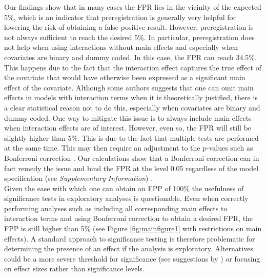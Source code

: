 
Our findings show that in many cases the FPR lies in the vicinity of the expected 5\%, which is an indicator that preregistration is generally very helpful for lowering the risk of obtaining a false-positive result. However, preregistration is not always sufficient to reach the desired 5\%. In particular, preregistration does not help when using interactions without main effects and especially when covariates are binary and dummy coded. In this case, the FPR can reach 34.5\%. This happens due to the fact that the interaction effect captures the true effect of the covariate that would have otherwise been expressed as a significant main effect of the covariate. Although some authors suggests that one can omit main effects in models with interaction terms when it is theoretically justified, there is a clear statistical reason not to do this, especially when covariates are binary and dummy coded. One way to mitigate this issue is to always include main effects when interaction effects are of interest. However, even so, the FPR will still be slightly higher than 5\%. This is due to the fact that multiple tests are performed at the same time. This may then require an adjustment to the p-values such as Bonferroni correction \citep{dunn1961multiple}. Our calculations show that a Bonferroni correction can in fact remedy the issue and bind the FPR at the level 0.05 regardless of the model specification (see \textit{Supplementary Information}) . \\

Given the ease with which one can obtain an FPP of 100\% the usefulness of significance tests in exploratory analyses is questionable. Even when correctly performing analyses such as including all corresponding main effects to interaction terms and using Bonferroni correction to obtain a desired FPR, the FPP is still higher than 5\% (see Figure \ref{fig:mainfigure1} with restrictions on main effects). A standard approach to significance testing is therefore problematic for determining the presence of an effect if the analysis is exploratory. Alternatives could be a more severe threshold for significance (see suggestions by \cite{benjamin2018}) or focusing on effect sizes rather than significance levels. \\
    

